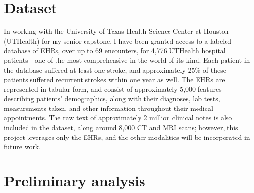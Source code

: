\documentclass{article}
\begin{document}
\section{Dataset}
In working with the University of Texas Health Science Center at Houston (UTHealth) for my senior capstone, I have been granted access to a labeled database of EHRs, over up to 69 encounters, for 4,776 UTHealth hospital patients---one of the most comprehensive in the world of its kind. Each patient in the database suffered at least one stroke, and approximately 25\% of these patients suffered recurrent strokes within one year as well. The EHRs are represented in tabular form, and consist of approximately 5,000 features describing patients' demographics, along with their diagnoses, lab tests, measurements taken, and other information throughout their medical appointments. The raw text of approximately 2 million clinical notes is also included in the dataset, along around 8,000 CT and MRI scans; however, this project leverages only the EHRs, and the other modalities will be incorporated in future work.


\section{Preliminary analysis}
\end{document}
